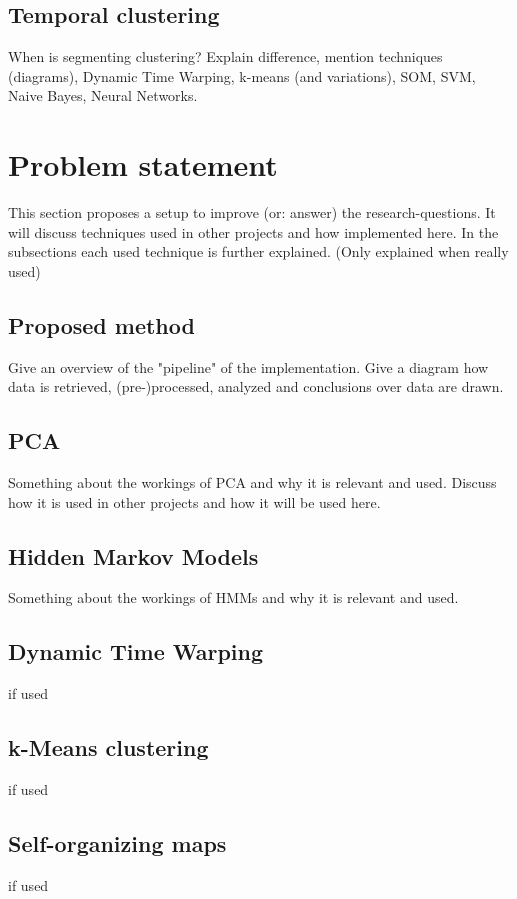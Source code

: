 \documentclass[a4paper,10pt]{extarticle}
\begin{document}
  \subsection{Temporal clustering}
  When is segmenting clustering? Explain difference, mention techniques (diagrams), Dynamic Time Warping, k-means (and variations), SOM, SVM, Naive Bayes, Neural Networks.


\section{Problem statement}
This section proposes a setup to improve (or: answer) the research-questions. It will discuss techniques used in other projects and how implemented here. In the subsections each used technique is further explained. (Only explained when really used)

  \subsection{Proposed method}
  Give an overview of the "pipeline" of the implementation. Give a diagram how data is retrieved, (pre-)processed, analyzed and conclusions over data are drawn.

  \subsection{PCA}
  Something about the workings of PCA and why it is relevant and used. Discuss how it is used in other projects and how it will be used here.

  \subsection{Hidden Markov Models}
  Something about the workings of HMMs and why it is relevant and used.

  \subsection{Dynamic Time Warping}
  if used

  \subsection{k-Means clustering}
  if used

  \subsection{Self-organizing maps}
  if used
\end{document}
